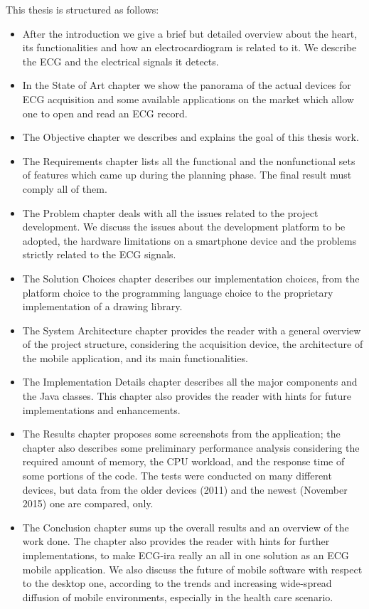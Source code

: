 This thesis is structured as follows: 
\begin{itemize}
	\item After the introduction we give a brief but detailed overview about the heart, its functionalities and how an electrocardiogram is related to it. We describe the ECG and the electrical signals it detects.
	\item In the State of Art chapter we show the panorama of the actual devices for ECG acquisition and some available applications on the market which allow one to open and read an ECG record.
	\item The Objective chapter we describes and explains the goal of this thesis work.
	\item The Requirements chapter lists all the functional and the nonfunctional sets of features which came up during the planning phase. The final result must comply all of them.
	\item The Problem chapter deals with all the issues related to the project development. We discuss the issues about the development platform to be adopted, the hardware limitations on a smartphone device and the problems strictly related to the ECG signals.
	\item The Solution Choices chapter describes our implementation choices, from the platform choice to the programming language choice to the proprietary implementation of a drawing library.
	\item The System Architecture chapter provides the reader with a general overview of the project structure, considering the acquisition device, the architecture of the mobile application, and its main functionalities.
	\item The Implementation Details chapter describes all the major components and the Java classes. This chapter also provides the reader with hints for future implementations and enhancements.
	\item The Results chapter proposes some screenshots from the application; the chapter also describes some preliminary performance analysis considering the required amount of memory, the CPU workload, and the response time of some portions of the code. The tests were conducted on many different devices, but data from the older devices (2011) and the newest (November 2015) one are compared, only.
	\item The Conclusion chapter sums up the overall results and an overview of the work done.
	The chapter also provides the reader with hints for further implementations, to make ECG-ira really an all in one solution as an ECG mobile application. We also discuss the future of mobile software with respect to the desktop one, according to the trends and increasing wide-spread diffusion of mobile environments, especially in the health care scenario.
\end{itemize}